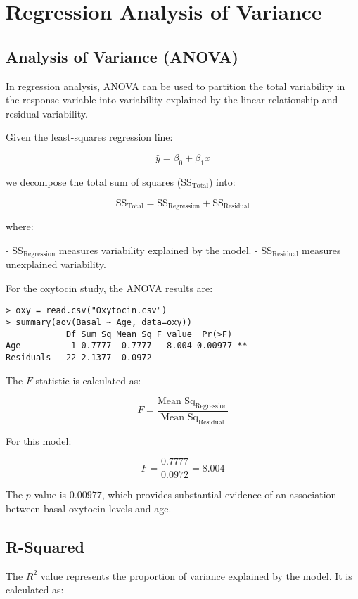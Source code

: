 \documentclass{article}
\begin{document}
\section{Regression Analysis of Variance}

\subsection{Analysis of Variance (ANOVA)}

In regression analysis, ANOVA can be used to partition the total variability in the response variable into variability explained by the linear relationship and residual variability.

Given the least-squares regression line:

\[
\hat{y} = \beta_0 + \beta_1 x
\]

we decompose the total sum of squares (SS\(_\text{Total}\)) into:

\[
\text{SS}_\text{Total} = \text{SS}_\text{Regression} + \text{SS}_\text{Residual}
\]

where:

- \(\text{SS}_\text{Regression}\) measures variability explained by the model.
- \(\text{SS}_\text{Residual}\) measures unexplained variability.

For the oxytocin study, the ANOVA results are:

\begin{verbatim}
> oxy = read.csv("Oxytocin.csv")
> summary(aov(Basal ~ Age, data=oxy))
            Df Sum Sq Mean Sq F value  Pr(>F)   
Age          1 0.7777  0.7777   8.004 0.00977 **
Residuals   22 2.1377  0.0972
\end{verbatim}

The \( F \)-statistic is calculated as:

\[
F = \frac{\text{Mean Sq}_\text{Regression}}{\text{Mean Sq}_\text{Residual} }
\]

For this model:

\[
F = \frac{0.7777}{0.0972} = 8.004
\]

The \( p \)-value is \( 0.00977 \), which provides substantial evidence of an association between basal oxytocin levels and age.

\subsection{R-Squared}

The \( R^2 \) value represents the proportion of variance explained by the model. It is calculated as:
\end{document}
